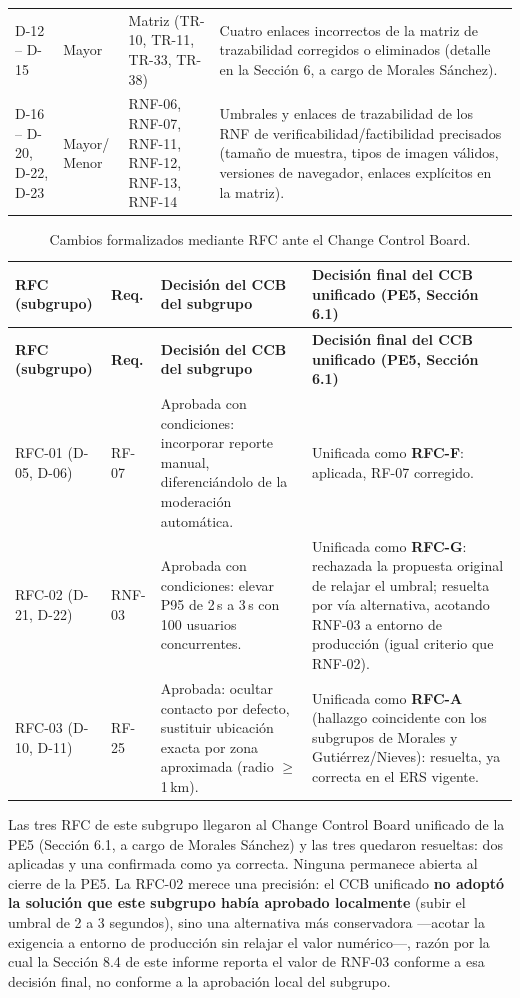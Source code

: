 \documentclass[11pt]{article}
\begin{document}
\begin{longtable}{C{1.2cm} L{1.7cm} L{2.5cm} L{7cm}}
		\addlinespace
		D-12 -- D-15 & Mayor & Matriz (TR-10, TR-11, TR-33, TR-38) & Cuatro enlaces incorrectos de la matriz de trazabilidad corregidos o eliminados (detalle en la Sección 6, a cargo de Morales Sánchez). \\
		\addlinespace
		D-16 -- D-20, D-22, D-23 & Mayor/ Menor & RNF-06, RNF-07, RNF-11, RNF-12, RNF-13, RNF-14 & Umbrales y enlaces de trazabilidad de los RNF de verificabilidad/factibilidad precisados (tamaño de muestra, tipos de imagen válidos, versiones de navegador, enlaces explícitos en la matriz). \\
	\end{longtable}
	
	\begin{longtable}{L{2.7cm} L{1.6cm} L{4cm} L{5.8cm}}
		\caption{Cambios formalizados mediante RFC ante el Change Control Board.}\label{tab:rfc-fuertes}\\
		\toprule
		\textbf{RFC (subgrupo)} & \textbf{Req.} & \textbf{Decisión del CCB del subgrupo} & \textbf{Decisión final del CCB unificado (PE5, Sección 6.1)} \\
		\midrule
		\endfirsthead
		\toprule
		\textbf{RFC (subgrupo)} & \textbf{Req.} & \textbf{Decisión del CCB del subgrupo} & \textbf{Decisión final del CCB unificado (PE5, Sección 6.1)} \\
		\midrule
		\endhead
		\bottomrule
		\endfoot
		RFC-01 (D-05, D-06) & RF-07 & Aprobada con condiciones: incorporar reporte manual, diferenciándolo de la moderación automática. & Unificada como \textbf{RFC-F}: aplicada, RF-07 corregido. \\
		\addlinespace
		RFC-02 (D-21, D-22) & RNF-03 & Aprobada con condiciones: elevar P95 de 2\,s a 3\,s con 100 usuarios concurrentes. & Unificada como \textbf{RFC-G}: rechazada la propuesta original de relajar el umbral; resuelta por vía alternativa, acotando RNF-03 a entorno de producción (igual criterio que RNF-02). \\
		\addlinespace
		RFC-03 (D-10, D-11) & RF-25 & Aprobada: ocultar contacto por defecto, sustituir ubicación exacta por zona aproximada (radio $\geq$ 1\,km). & Unificada como \textbf{RFC-A} (hallazgo coincidente con los subgrupos de Morales y Gutiérrez/Nieves): resuelta, ya correcta en el ERS vigente. \\
	\end{longtable}
	
	Las tres RFC de este subgrupo llegaron al Change Control Board unificado de la PE5 (Sección 6.1, a cargo de Morales Sánchez) y las tres quedaron resueltas: dos aplicadas y una confirmada como ya correcta. Ninguna permanece abierta al cierre de la PE5. La RFC-02 merece una precisión: el CCB unificado \textbf{no adoptó la solución que este subgrupo había aprobado localmente} (subir el umbral de 2 a 3 segundos), sino una alternativa más conservadora ---acotar la exigencia a entorno de producción sin relajar el valor numérico---, razón por la cual la Sección 8.4 de este informe reporta el valor de RNF-03 conforme a esa decisión final, no conforme a la aprobación local del subgrupo.
	
\end{document}
